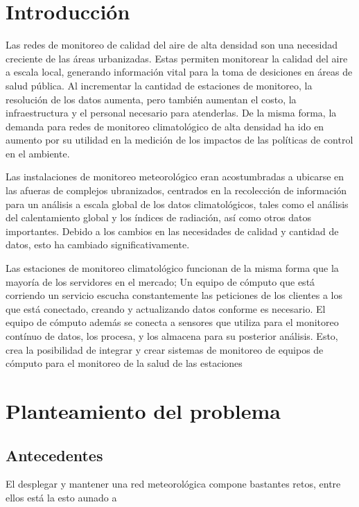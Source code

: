 \section{Introducción}

Las redes de monitoreo de calidad del aire de alta densidad son una necesidad creciente de las áreas urbanizadas. Estas permiten monitorear la calidad del aire a escala local, generando información vital para la toma de desiciones en áreas de salud pública. Al incrementar la cantidad de estaciones de monitoreo, la resolución de los datos aumenta, pero también aumentan el costo, la infraestructura y el personal necesario para atenderlas\cite{urban_air_quality}. De la misma forma, la demanda para redes de monitoreo climatológico de alta densidad ha ido en aumento por su utilidad en la medición de los impactos de las políticas de control en el ambiente\cite{muller_sensors_and_the_city}.

Las instalaciones de monitoreo meteorológico eran acostumbradas a ubicarse en las afueras de complejos ubranizados, centrados en la recolección de información para un análisis a escala global de los datos climatológicos, tales como el análisis del calentamiento global y los índices de radiación, así como otros datos importantes. Debido a los cambios en las necesidades de calidad y cantidad de datos, esto ha cambiado significativamente\cite{oke_2004}.

Las estaciones de monitoreo climatológico funcionan de la misma forma que la mayoría de los servidores en el mercado; Un equipo de cómputo que está corriendo un servicio escucha constantemente las peticiones de los clientes a los que está conectado, creando y actualizando datos conforme es necesario. El equipo de cómputo además se conecta a sensores que utiliza para el monitoreo contínuo de datos, los procesa, y los almacena para su posterior análisis. Esto, crea la posibilidad de integrar y crear sistemas de monitoreo de equipos de cómputo para el monitoreo de la salud de las estaciones

\section{Planteamiento del problema}

\subsection{Antecedentes}

El desplegar y mantener una red meteorológica compone bastantes retos, entre ellos está la  esto aunado a

